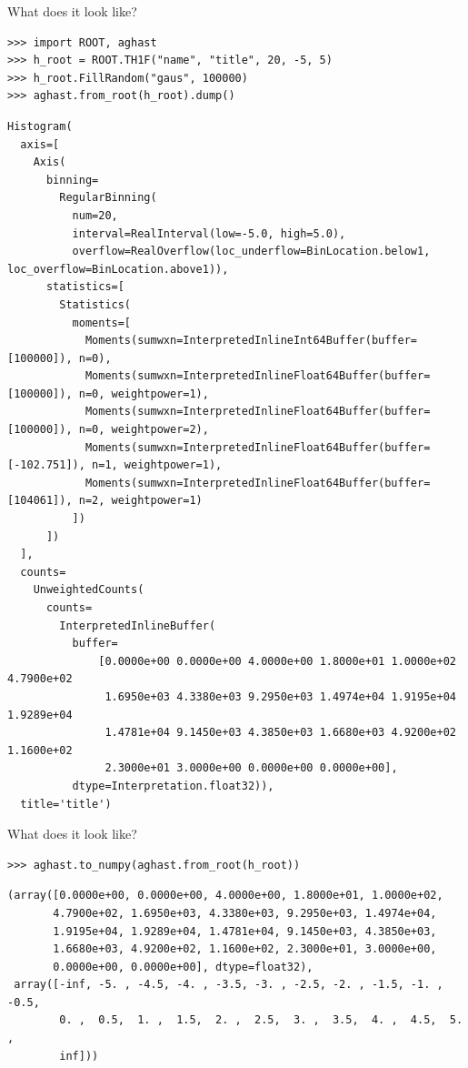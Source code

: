 \documentclass[aspectratio=169]{beamer}
\begin{document}
\begin{frame}[fragile]{What does it look like?}
\small
\begin{verbatim}
>>> import ROOT, aghast
>>> h_root = ROOT.TH1F("name", "title", 20, -5, 5)
>>> h_root.FillRandom("gaus", 100000)
>>> aghast.from_root(h_root).dump()
\end{verbatim}


\tiny
\begin{verbatim}
Histogram(
  axis=[
    Axis(
      binning=
        RegularBinning(
          num=20,
          interval=RealInterval(low=-5.0, high=5.0),
          overflow=RealOverflow(loc_underflow=BinLocation.below1, loc_overflow=BinLocation.above1)),
      statistics=[
        Statistics(
          moments=[
            Moments(sumwxn=InterpretedInlineInt64Buffer(buffer=[100000]), n=0),
            Moments(sumwxn=InterpretedInlineFloat64Buffer(buffer=[100000]), n=0, weightpower=1),
            Moments(sumwxn=InterpretedInlineFloat64Buffer(buffer=[100000]), n=0, weightpower=2),
            Moments(sumwxn=InterpretedInlineFloat64Buffer(buffer=[-102.751]), n=1, weightpower=1),
            Moments(sumwxn=InterpretedInlineFloat64Buffer(buffer=[104061]), n=2, weightpower=1)
          ])
      ])
  ],
  counts=
    UnweightedCounts(
      counts=
        InterpretedInlineBuffer(
          buffer=
              [0.0000e+00 0.0000e+00 4.0000e+00 1.8000e+01 1.0000e+02 4.7900e+02
               1.6950e+03 4.3380e+03 9.2950e+03 1.4974e+04 1.9195e+04 1.9289e+04
               1.4781e+04 9.1450e+03 4.3850e+03 1.6680e+03 4.9200e+02 1.1600e+02
               2.3000e+01 3.0000e+00 0.0000e+00 0.0000e+00],
          dtype=Interpretation.float32)),
  title='title')
\end{verbatim}
\end{frame}

\begin{frame}[fragile]{What does it look like?}
\small
\begin{verbatim}
>>> aghast.to_numpy(aghast.from_root(h_root))
\end{verbatim}

\scriptsize
\begin{verbatim}
(array([0.0000e+00, 0.0000e+00, 4.0000e+00, 1.8000e+01, 1.0000e+02,
       4.7900e+02, 1.6950e+03, 4.3380e+03, 9.2950e+03, 1.4974e+04,
       1.9195e+04, 1.9289e+04, 1.4781e+04, 9.1450e+03, 4.3850e+03,
       1.6680e+03, 4.9200e+02, 1.1600e+02, 2.3000e+01, 3.0000e+00,
       0.0000e+00, 0.0000e+00], dtype=float32),
 array([-inf, -5. , -4.5, -4. , -3.5, -3. , -2.5, -2. , -1.5, -1. , -0.5,
        0. ,  0.5,  1. ,  1.5,  2. ,  2.5,  3. ,  3.5,  4. ,  4.5,  5. ,
        inf]))
\end{verbatim}

\end{frame}
\end{document}
